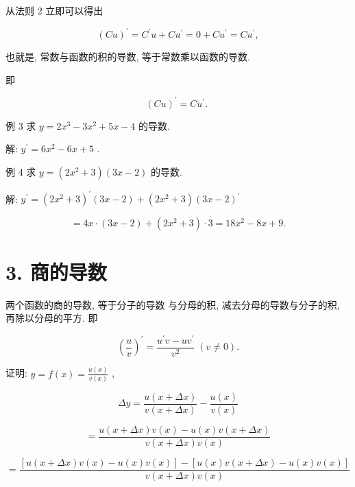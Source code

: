 \documentclass[lang=cn,newtx,12pt,scheme=chinese]{elegantbook}
\begin{document}
从法则 2 立即可以得出

\[
{\left( Cu\right) }^{\prime } = {C}^{\prime }u + C{u}^{\prime } = 0 + C{u}^{\prime } = C{u}^{\prime },
\]

也就是, 常数与函数的积的导数, 等于常数乘以函数的导数.

即

\[
{\left( Cu\right) }^{\prime } = C{u}^{\prime }\text{. }
\]

例 3 求 \(y = 2{x}^{3} - 3{x}^{2} + {5x} - 4\) 的导数.

解: \({y}^{\prime } = 6{x}^{2} - {6x} + 5\) .

例 4 求 \(y = \left( {2{x}^{2} + 3}\right) \left( {{3x} - 2}\right)\) 的导数.

解: \({y}^{\prime } = {\left( 2{x}^{2} + 3\right) }^{\prime }\left( {{3x} - 2}\right) + \left( {2{x}^{2} + 3}\right) {\left( 3x - 2\right) }^{\prime }\)

\[
= {4x} \cdot \left( {{3x} - 2}\right) + \left( {2{x}^{2} + 3}\right) \cdot 3 = {18}{x}^{2} - {8x} + 9\text{.}
\]

\section*{3. 商的导数}

\begin{proposition}[法则3(除法法则)]

两个函数的商的导数, 等于分子的导数 与分母的积, 减去分母的导数与分子的积, 再除以分母的平方. 即

\[
{\left( \frac{u}{v}\right) }^{\prime } = \frac{{u}^{\prime }v - u{v}^{\prime }}{{v}^{2}}\;\left( {v \neq 0}\right) .
\]

\end{proposition}

证明: \(y = f\left( x\right) = \frac{u\left( x\right) }{v\left( x\right) }\) ,

\[
{\Delta y} = \frac{u\left( {x + {\Delta x}}\right) }{v\left( {x + {\Delta x}}\right) } - \frac{u\left( x\right) }{v\left( x\right) }
\]

\[
= \frac{u\left( {x + {\Delta x}}\right) v\left( x\right) - u\left( x\right) v\left( {x + {\Delta x}}\right) }{v\left( {x + {\Delta x}}\right) v\left( x\right) }
\]

\[
= \frac{\left\lbrack {u\left( {x + {\Delta x}}\right) v\left( x\right) - u\left( x\right) v\left( x\right) }\right\rbrack - \left\lbrack {u\left( x\right) v\left( {x + {\Delta x}}\right) - u\left( x\right) v\left( x\right) }\right\rbrack }{v\left( {x + {\Delta x}}\right) v\left( x\right) }
\]
\end{document}
